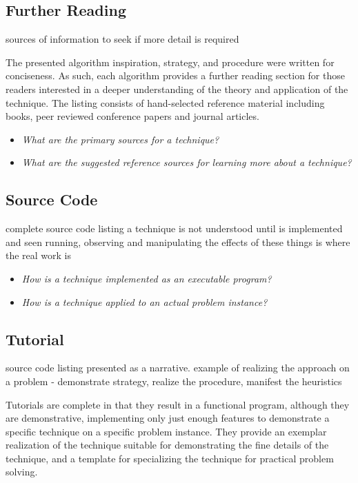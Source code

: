 \documentclass[a4paper, 11pt]{article}
\begin{document}
\subsection{Further Reading}
sources of information to seek if more detail is required

The presented algorithm inspiration, strategy, and procedure were written for conciseness. As such, each algorithm provides a further reading section for those readers interested in a deeper understanding of the theory and application of the technique. The listing consists of hand-selected reference material including books, peer reviewed conference papers and journal articles.

\begin{itemize}
	\item \emph{What are the primary sources for a technique?}
	\item \emph{What are the suggested reference sources for learning more about a technique?}
\end{itemize}

\subsection{Source Code}
complete source code listing
a technique is not understood until is implemented and seen running, observing and manipulating the effects of these things is where the real work is 

\begin{itemize}
	\item \emph{How is a technique implemented as an executable program?}
	\item \emph{How is a technique applied to an actual problem instance?}
\end{itemize}

\subsection{Tutorial}
source code listing presented as a narrative. example of realizing the approach on a problem - demonstrate strategy, realize the procedure, manifest the heuristics

Tutorials are complete in that they result in a functional program, although they are demonstrative, implementing only just enough features to demonstrate a specific technique on a specific problem instance. They provide an exemplar realization of the technique suitable for demonstrating the fine details of the technique, and a template for specializing the technique for practical problem solving. 
\end{document}
